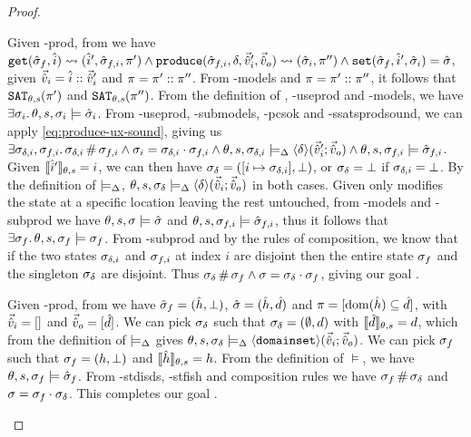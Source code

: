 \begin{proof}
\begin{hypvlist}
 Given \hyp{prod}, from  we have $\texttt{get}(\hat{\sigma}_f,\hat{i})\rightsquigarrow(\hat{i}',\hat{\sigma}_{f,i},\pi') \land \texttt{produce}(\hat{\sigma}_{f,i},\delta,\vec{\hat{v}}_i',\vec{\hat{v}}_o)\rightsquigarrow (\hat{\sigma}_i,\pi'') \land \texttt{set}(\hat{\sigma}_f,\hat{i}',\hat{\sigma}_i)=\hat{\sigma}$, given $\vec{\hat{v}}_i=\hat{i}::\vec{\hat{v}}_i'$ and $\pi=\pi'::\pi''$.
 From \hyp{models} and $\pi=\pi'::\pi''$, it follows that $\texttt{SAT}_{\mathit{\theta,s}}(\pi')$ and $\texttt{SAT}_{\mathit{\theta,s}}(\pi'')$.
 From the definition of , \hyp{useprod} and \hyp{models}, we have $\exists \sigma_i\ldotp \theta,s,\sigma_i\models \hat{\sigma}_i$.
 From \hyp{useprod}, \hyp{submodels}, \hyp{pcsok} and \hyp{ssatsprodsound}, we can apply \ref{eq:produce-ux-sound}, giving us $\exists \sigma_{\delta,i}, \sigma_{f,i}\ldotp \sigma_{\delta,i}\operatorname{\#}\sigma_{f,i} \land \sigma_i=\sigma_{\delta,i}\cdot\sigma_{f,i} \land \theta,s,\sigma_{\delta,i}\models_{\Delta} \left<\delta\right>\!(\vec{\hat{v}}_i';\vec{\hat{v}}_o) \land \theta,s,\sigma_{f,i}\models\hat{\sigma}_{f,i}$.
 Given $\llbracket\hat{i}'\rrbracket_{\theta,s}=i$, we can then have $\sigma_\delta=([i\mapsto \sigma_{\delta,i}], \bot)$, or $\sigma_\delta=\bot$ if $\sigma_{\delta,i}=\bot$. By the definition of $\models_{\Delta}$, $\theta,s,\sigma_\delta\models_{\Delta}\left<\delta\right>\!(\vec{\hat{v}}_i;\vec{\hat{v}}_o)$ in both cases.
 Given  only modifies the state at a specific location leaving the rest untouched, from \hyp{models} and \hyp{subprod} we have $\theta,s,\sigma\models\hat{\sigma}$ and $\theta,s,\sigma_{f,i}\models\hat{\sigma}_{f,i}$, thus it follows that $\exists \sigma_f\ldotp \theta,s,\sigma_f\models\sigma_f$.
 From \hyp{subprod} and by the rules of composition, we know that if the two states $\sigma_{\delta,i}$ and $\sigma_{f,i}$ at index $i$ are disjoint then the entire state $\sigma_f$ and the singleton $\sigma_\delta$ are disjoint. Thus $\sigma_\delta\operatorname{\#}\sigma_f\land\sigma=\sigma_\delta\cdot\sigma_f$, giving our goal .
\end{hypvlist}

\pfcase{$\delta = \domainset$}

\begin{hypvlist}
 Given \hyp{prod}, from  we have $\hat{\sigma}_f=(\hat{h},\bot)$, $\hat{\sigma}=(\hat{h},\hat{d})$ and $\pi=[\operatorname{dom}(\hat{h})\subseteq \hat{d}]$, with $\vec{\hat{v}}_i=[]$ and $\vec{\hat{v}}_o=[\hat{d}]$.
 We can pick $\sigma_\delta$ such that $\sigma_\delta=(\emptyset,d)$ with $\llbracket\hat{d}\rrbracket_{\theta,s}=d$, which from the definition of $\models_{\Delta}$ gives $\theta,s,\sigma_\delta\models_{\Delta}\left<\texttt{domainset}\right>\!(\vec{\hat{v}}_i;\vec{\hat{v}}_o)$.
 We can pick $\sigma_f$ such that $\sigma_f=(h,\bot)$ and $\llbracket\hat{h}\rrbracket_{\theta,s}=h$. From the definition of $\models$, we have $\theta,s,\sigma_f\models\hat{\sigma}_f$.
 From \hyp{stdisds}, \hyp{stfish} and composition rules we have $\sigma_f\operatorname{\#}\sigma_\delta$ and $\sigma=\sigma_f\cdot\sigma_\delta$. This completes our goal .
\end{hypvlist}


\end{proof}
